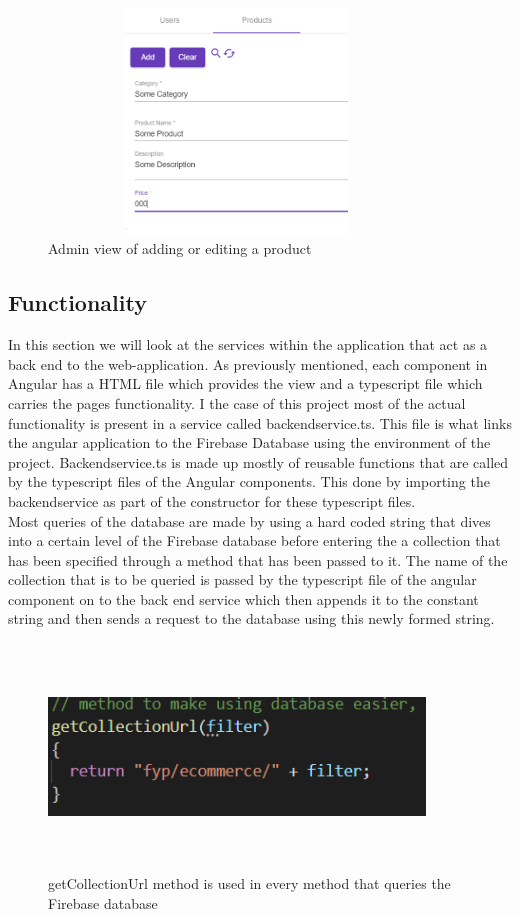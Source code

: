 \begin{figure}[h!]
    	\caption{Admin view of adding or editing a product}
	\centering
	\includegraphics[width=10cm, height=6cm]{images/adminadd.png}
\end{figure}

\subsection{Functionality}
In this section we will look at the services within the application that act as a back end to the web-application. As previously mentioned, each component in Angular has a HTML file which provides the view and a typescript file which carries the pages functionality. I the case of this project most of the actual functionality is present in a service called backendservice.ts. This file is what links the angular application to the Firebase Database using the environment of the project. Backendservice.ts is made up mostly of reusable functions that are called by the typescript files of the Angular components. This done by importing the backendservice as part of the constructor for these typescript files.
\\
Most queries of the database are made by using a hard coded string that dives into a certain level of the Firebase database before entering the a collection that has been specified through a method that has been passed to it. The name of the collection that is to be queried is passed by the typescript file of the angular component on to the back end service which then appends it to the constant string and then sends a request to the database using this newly formed string.

\begin{figure}[h!]
    	\caption{getCollectionUrl method is used in every method that queries the Firebase database}
	\centering
	\includegraphics[width=10cm, height=6cm]{images/collurl.png}
\end{figure}
\newpage

